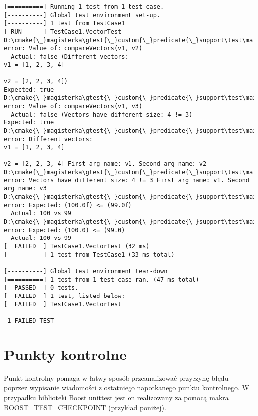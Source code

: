 \documentclass[12pt,a4paper,notitlepage]{report}
\begin{document}
		\begin{lstlisting}[label=some-code,caption=Przykłądowy negatywny wynik testu w bibliotece Google test]
[==========] Running 1 test from 1 test case.
[----------] Global test environment set-up.
[----------] 1 test from TestCase1
[ RUN      ] TestCase1.VectorTest
D:\cmake{\_}magisterka\gtest{\_}custom{\_}predicate{\_}support\test\main.cpp(63): error: Value of: compareVectors(v1, v2)
  Actual: false (Different vectors:
v1 = [1, 2, 3, 4]

v2 = [2, 2, 3, 4])
Expected: true
D:\cmake{\_}magisterka\gtest{\_}custom{\_}predicate{\_}support\test\main.cpp(64): error: Value of: compareVectors(v1, v3)
  Actual: false (Vectors have different size: 4 != 3)
Expected: true
D:\cmake{\_}magisterka\gtest{\_}custom{\_}predicate{\_}support\test\main.cpp(67): error: Different vectors:
v1 = [1, 2, 3, 4]

v2 = [2, 2, 3, 4] First arg name: v1. Second arg name: v2
D:\cmake{\_}magisterka\gtest{\_}custom{\_}predicate{\_}support\test\main.cpp(68): error: Vectors have different size: 4 != 3 First arg name: v1. Second arg name: v3
D:\cmake{\_}magisterka\gtest{\_}custom{\_}predicate{\_}support\test\main.cpp(70): error: Expected: (100.0f) <= (99.0f)
  Actual: 100 vs 99
D:\cmake{\_}magisterka\gtest{\_}custom{\_}predicate{\_}support\test\main.cpp(71): error: Expected: (100.0) <= (99.0)
  Actual: 100 vs 99
[  FAILED  ] TestCase1.VectorTest (32 ms)
[----------] 1 test from TestCase1 (33 ms total)

[----------] Global test environment tear-down
[==========] 1 test from 1 test case ran. (47 ms total)
[  PASSED  ] 0 tests.
[  FAILED  ] 1 test, listed below:
[  FAILED  ] TestCase1.VectorTest

 1 FAILED TEST
		\end{lstlisting}

\chapter{Punkty kontrolne}

Punkt kontrolny pomaga w łatwy sposób przeanalizować przyczynę błędu poprzez wypisanie wiadomości z ostatniego napotkanego punktu kontrolnego. W przypadku biblioteki Boost unittest jest on realizowany za pomocą makra BOOST{\_}TEST{\_}CHECKPOINT (przykład poniżej).
\end{document}
